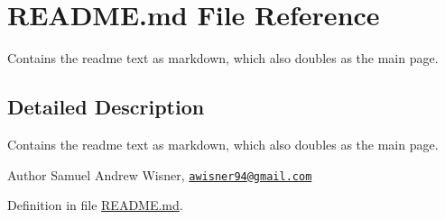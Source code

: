 \hypertarget{README_8md}{\section{R\+E\+A\+D\+M\+E.\+md File Reference}
\label{README_8md}
}


Contains the readme text as markdown, which also doubles as the main page.  




\subsection{Detailed Description}
Contains the readme text as markdown, which also doubles as the main page. 

\begin{DoxyAuthor}{Author}
Samuel Andrew Wisner, \href{mailto:awisner94@gmail.com}{\tt awisner94@gmail.\+com} 
\end{DoxyAuthor}


Definition in file \hyperlink{README_8md_source}{R\+E\+A\+D\+M\+E.\+md}.

